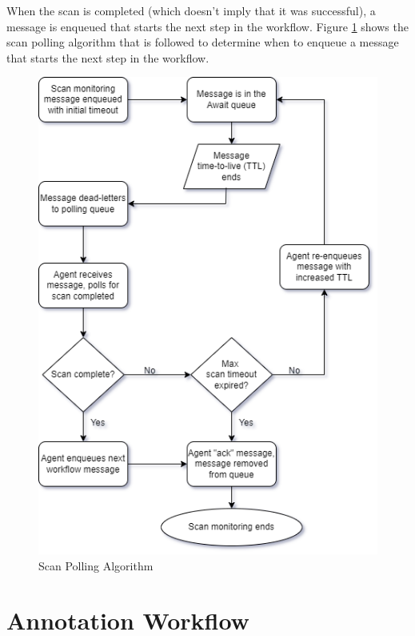 When the scan is completed (which doesn't imply that it was successful), a message
is enqueued that starts the next step in the workflow.  
Figure \ref{fig:polling-flowchart} shows the scan polling algorithm that is followed
to determine when to enqueue a message that starts the next step in the workflow.

\begin{figure}[ht]
    \includegraphics[width=\textwidth, scale=.75]{graphics/cxoneflow-diagrams-Polling Algorithm.png}
    \caption{Scan Polling Algorithm}
    \label{fig:polling-flowchart}
\end{figure}

\section{Annotation Workflow}\label{sec:annotation-workflow}

